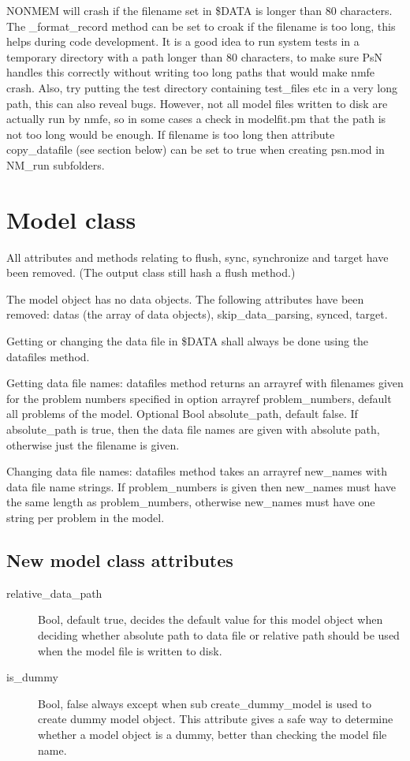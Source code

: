 NONMEM will crash if the filename set in \$DATA is longer than 80 characters. The \_format\_record method can
be set to croak if the filename is too long, this helps during code development. It is a good idea to run system tests in
a temporary directory with a path longer than 80 characters, to make sure PsN handles this correctly without
writing too long paths that would make nmfe crash. Also, try putting the test directory containing test\_files
etc in a very long path, this can also reveal bugs.
However, not all model files written to disk are actually run by nmfe, so in some cases
a check in modelfit.pm that the path is not too long would be enough.
If filename is too long then attribute copy\_datafile (see section below) can be set to true when creating psn.mod in NM\_run
subfolders.

\section{Model class}

All attributes and methods relating to flush, sync, synchronize and target have been removed. (The output class still hash a flush method.)

The model object has no data objects.
The following attributes have been removed: datas (the array of data objects), skip\_data\_parsing, synced, target.

Getting or changing the data file in \$DATA shall always be done using the datafiles method.

Getting data file names: datafiles method returns an arrayref with filenames given for the problem numbers specified in option arrayref problem\_numbers,
default all problems of the model. Optional Bool absolute\_path, default false. If absolute\_path is true, then the data file names
are given with absolute path, otherwise just the filename is given.

Changing data file names: datafiles method takes an arrayref new\_names with data file name strings. If problem\_numbers is
given then new\_names must have the same length as problem\_numbers, otherwise new\_names must have one string
per problem in the model.

\subsection{New model class attributes}
\begin{description}
\item[relative\_data\_path] Bool, default true, decides the default value for this model object when
deciding whether absolute path to data file or relative path should be used when the model file is written to disk.
\item[is\_dummy] Bool, false always except when sub create\_dummy\_model is used to create dummy model object. This attribute
gives a safe way to determine whether a model object is a dummy, better than checking the model file name.
\end{description}

